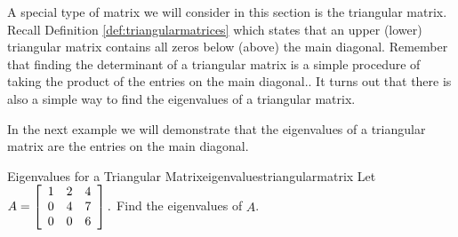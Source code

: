 %
%
%

A special type of matrix we will consider in this section is
the triangular matrix.  Recall Definition \ref{def:triangularmatrices}
which states that an upper (lower) triangular matrix contains all
zeros below (above) the main diagonal. Remember that finding the
determinant of a triangular matrix is a simple procedure of taking the product of the entries on the main diagonal.. It turns out
that there is also a simple way to find the eigenvalues of a
triangular matrix.

In the next example we will demonstrate that the eigenvalues of a 
triangular matrix are the entries on the main diagonal. 

\begin{example}{Eigenvalues for a Triangular Matrix}{eigenvaluestriangularmatrix}
Let $A=\left[
\begin{array}{rrr}
1 & 2 & 4 \\
0 & 4 & 7 \\
0 & 0 & 6
\end{array}
\right] .$ Find the eigenvalues of $A$.
\end{example}

